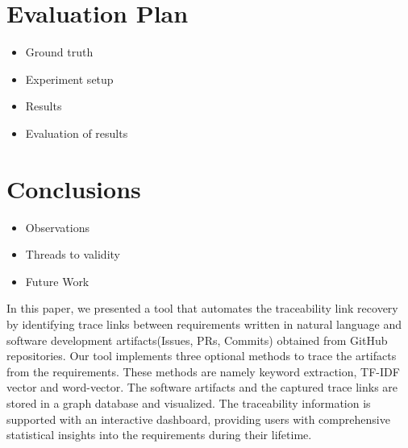 \documentclass[conference]{IEEEtran}
\begin{document}
\section{Evaluation Plan}
\label{section:evaluation}

\begin{itemize}
    \item Ground truth 
    \item Experiment setup
    \item Results
    \item Evaluation of results
\end{itemize}
\section{Conclusions}\label{section:conclusion}

\begin{itemize}
    \item Observations
    \item Threads to validity
    \item Future Work
\end{itemize}

In this paper, we presented a tool that automates the traceability link recovery by identifying trace links between requirements written in natural language and software development artifacts(Issues, PRs, Commits) obtained from GitHub repositories. Our tool implements three optional methods to trace the artifacts from the requirements. These methods are namely keyword extraction, TF-IDF vector and word-vector. The software artifacts and the captured trace links are stored in a graph database and visualized. The traceability information is supported with an interactive dashboard, providing users with comprehensive statistical insights into the requirements during their lifetime.
\end{document}
